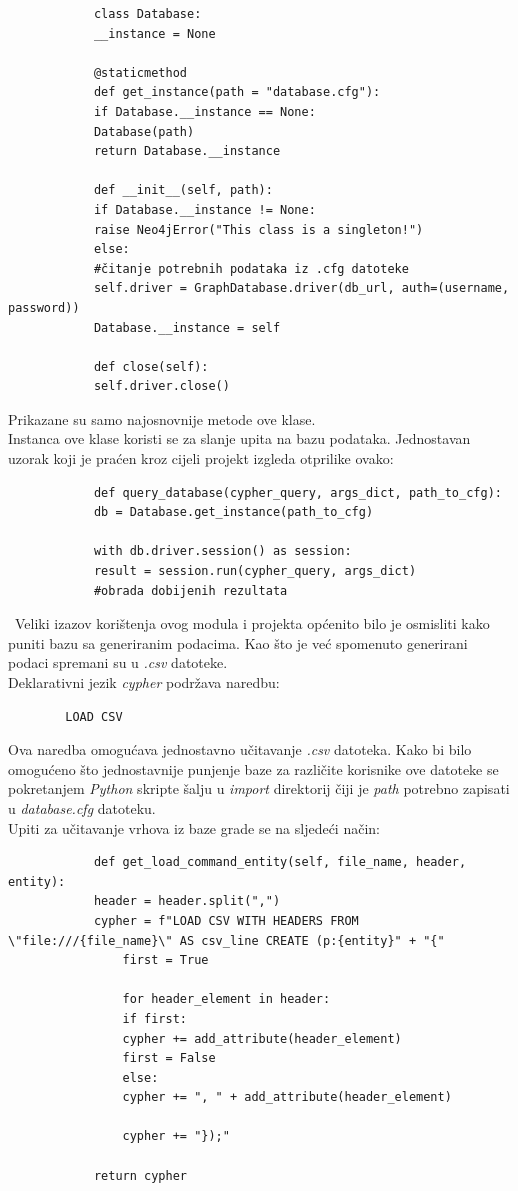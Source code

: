 \documentclass[titlepage, 12pt]{scrartcl}
\begin{document}
	\begin{samepage}
		\begin{verbatim}
			class Database:
			__instance = None
			
			@staticmethod
			def get_instance(path = "database.cfg"):
			if Database.__instance == None:
			Database(path)
			return Database.__instance
			
			def __init__(self, path):
			if Database.__instance != None:
			raise Neo4jError("This class is a singleton!")
			else:
			#čitanje potrebnih podataka iz .cfg datoteke
			self.driver = GraphDatabase.driver(db_url, auth=(username, password))
			Database.__instance = self
			
			def close(self):
			self.driver.close()
		\end{verbatim}
	\end{samepage}
	Prikazane su samo najosnovnije metode ove klase. \\
	Instanca ove klase koristi se za slanje upita na bazu podataka. Jednostavan uzorak koji je praćen kroz cijeli projekt izgleda otprilike ovako:
	\begin{samepage}
		\begin{verbatim}
			def query_database(cypher_query, args_dict, path_to_cfg):
			db = Database.get_instance(path_to_cfg)
			
			with db.driver.session() as session:
			result = session.run(cypher_query, args_dict)
			#obrada dobijenih rezultata
		\end{verbatim}
	\end{samepage}
	\
	Veliki izazov korištenja ovog modula i projekta općenito bilo je osmisliti kako puniti bazu sa generiranim podacima. Kao što je već spomenuto generirani podaci spremani su u \emph{.csv} datoteke. \\
	Deklarativni jezik \emph{cypher} podržava naredbu: 
	\begin{verbatim}
		LOAD CSV
	\end{verbatim}
	Ova naredba omogućava jednostavno učitavanje \emph{.csv} datoteka. Kako bi bilo omogućeno što jednostavnije punjenje baze za različite korisnike ove datoteke se pokretanjem \emph{Python} skripte šalju u \emph{import} direktorij čiji je \emph{path} potrebno zapisati u \emph{database.cfg} datoteku. \\
	Upiti za učitavanje vrhova iz baze grade se na sljedeći način:
	\begin{samepage}
		\begin{verbatim}
			def get_load_command_entity(self, file_name, header, entity):
			header = header.split(",")
			cypher = f"LOAD CSV WITH HEADERS FROM \"file:///{file_name}\" AS csv_line CREATE (p:{entity}" + "{"
				first = True
				
				for header_element in header:
				if first:
				cypher += add_attribute(header_element)
				first = False
				else:
				cypher += ", " + add_attribute(header_element)
				
				cypher += "});"
			
			return cypher
		\end{verbatim}
	\end{samepage}
\end{document}
